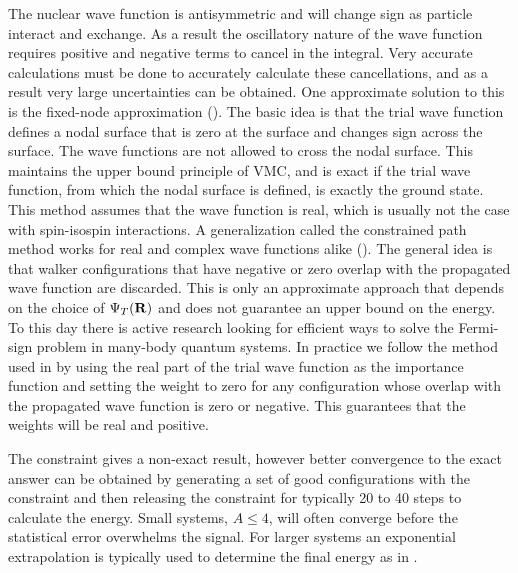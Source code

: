 The nuclear wave function is antisymmetric and will change sign as particle interact and exchange. As a result the oscillatory nature of the wave function requires positive and negative terms to cancel in the integral. Very accurate calculations must be done to accurately calculate these cancellations, and as a result very large uncertainties can be obtained. One approximate solution to this is the fixed-node approximation (\cite{moskowitz1982}). The basic idea is that the trial wave function defines a nodal surface that is zero at the surface and changes sign across the surface. The wave functions are not allowed to cross the nodal surface. This maintains the upper bound principle of VMC, and is exact if the trial wave function, from which the nodal surface is defined, is exactly the ground state. This method assumes that the wave function is real, which is usually not the case with spin-isospin interactions. A generalization called the constrained path method works for real and complex wave functions alike (\cite{wiringa2000}). The general idea is that walker configurations that have negative or zero overlap with the propagated wave function are discarded. This is only an approximate approach that depends on the choice of $\Psi_T(\mathbf{R})$ and does not guarantee an upper bound on the energy. To this day there is active research looking for efficient ways to solve the Fermi-sign problem in many-body quantum systems. In practice we follow the method used in \cite{zhang2003} by using the real part of the trial wave function as the importance function and setting the weight to zero for any configuration whose overlap with the propagated wave function is zero or negative. This guarantees that the weights will be real and positive.

The constraint gives a non-exact result, however better convergence to the exact answer can be obtained by generating a set of good configurations with the constraint and then releasing the constraint for typically 20 to 40 steps to calculate the energy. Small systems, $A\le4$, will often converge before the statistical error overwhelms the signal. For larger systems an exponential extrapolation is typically used to determine the final energy as in \cite{pudliner1997}.

